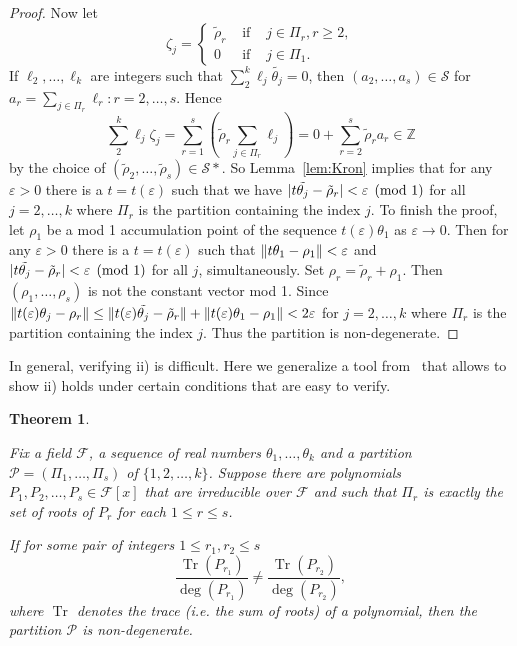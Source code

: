 \documentclass[11pt]{article}
\newtheorem{theorem}[theo]{Theorem}
\theoremstyle{definition}
\numberwithin{equation}{section}
\newcommand\+{\mkern2mu}
\newcommand{\Z}{\mathbb{Z}}
\newcommand{\F}{\mathcal{F}}
\newcommand{\Sl}{\mathcal{S}}
\newcommand{\ep}{\varepsilon}
\newcommand{\1}{\mathbf 1}
\newcommand{\tthe}[1][j]{\tilde{\theta_{#1}}}
\newcommand{\trho}{\tilde{\rho}}
\DeclareMathOperator{\Tr}{Tr}
\DeclarePairedDelimiter{\abs}{\lvert}{\rvert}
\DeclarePairedDelimiter{\znorm}{\lVert}{\rVert}
\begin{document}
\begin{proof}
Now let 
\[ \zeta_j = \left\{ 
\begin{array}{lll}
\trho_r & \mbox{ if } & j \in \Pi_r, r\geq 2,\\
0 & \mbox{ if } & j \in \Pi_1.
\end{array}
\right.
\]
If $\ell_2, \dots, \ell_k$ are integers such that $\sum_2^k \ell_j \tthe = 0$, then $(a_2,\dots,a_s) \in \Sl$ for $a_r = \sum_{j \in \Pi_r} \ell_r : r=2,\dots, s$. Hence  
\[ \sum_2^k \ell_j \zeta_j = \sum_{r=1}^s \left( \trho_r \sum_{j \in \Pi_r} \ell_j \right) = 0 + \sum_{r=2}^s \trho_r a_r  \in \Z\] by the choice of $(\trho_2,\dots, \trho_s) \in \Sl*$. So Lemma~\ref{lem:Kron} implies that for any $\ep > 0$ there is a $t = t(\ep)$ such that we have $\abs{t \tthe - \trho_r} < \ep \pmod{1} $ for all $j = 2,\dots,k$ where $\Pi_r$ is the partition containing the index $j$. To finish the proof, let $\rho_1$ be a mod 1 accumulation point of the sequence $t(\ep) \theta_1$ as $\ep \to 0$. Then for any $\ep >0 $ there is a $t = t(\ep)$ such that $\znorm{t \theta_1 -\rho_1} < \ep$ and $\abs{t \tthe - \trho_r} < \ep \pmod{1} $ for all $j$, simultaneously. Set $\rho_r = \trho_r + \rho_1$. Then $(\rho_1, \dots, \rho_s)$ is not the constant vector mod 1. Since $\znorm{t(\ep) \theta_j - \rho_r } \leq \znorm{t(\ep) \tthe - \trho_r} + \znorm{t(\ep) \theta_1 - \rho_1} < 2\ep$ for $j = 2,\dots,k$ where $\Pi_r$ is the partition containing the index $j$. Thus the partition is non-degenerate.
\end{proof}

In general, verifying ii) is difficult. Here we generalize a tool from~\cite{eisenberg2019pretty} that allows to show ii) holds under certain conditions that are easy to verify.

\begin{theorem}\label{thm:tr/deg}

Fix a field $\F$, a sequence of real numbers $\theta_1, \dots, \theta_k$ and a partition $\mathcal{P} = (\Pi_1,\dots,\Pi_s)$ of $\{1,2,\dots, k\}$. Suppose there are polynomials $P_1,P_2,\dots, P_s  \in \F[x]$ that are irreducible over $\F$ and such that $\Pi_r$ is exactly the set of roots of $P_r$ for each $1\leq r \leq s$. 

If for some pair of integers $1 \leq r_1, r_2 \leq s$
\[
\frac{\Tr(P_{r_1})}{\deg(P_{r_1})}\neq\frac{\Tr(P_{r_2})}{\deg(P_{r_2})},
\]
where $\Tr$ denotes the trace (i.e. the sum of roots) of a polynomial, then the partition $\mathcal{P}$ is non-degenerate. 
\end{theorem}
\end{document}
